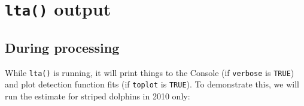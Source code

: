 \documentclass[
]{book}
\begin{document}
\hypertarget{lta-output}{%
\section*{\texorpdfstring{\texttt{lta()} output}{lta() output}}\label{lta-output}}

\hypertarget{during-processing}{%
\subsection*{During processing}\label{during-processing}}

While \texttt{lta()} is running, it will print things to the Console (if \texttt{verbose} is \texttt{TRUE}) and plot detection function fits (if \texttt{toplot} is \texttt{TRUE}). To demonstrate this, we will run the estimate for striped dolphins in 2010 only:
\end{document}
